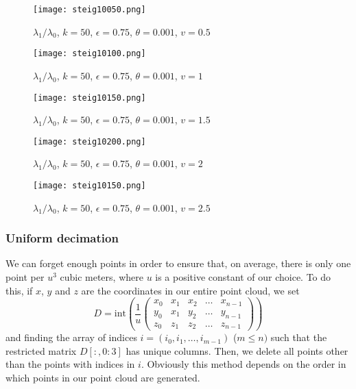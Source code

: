 \documentclass[a4paper,11pt,twoside]{article}
\theoremstyle{definition}
\theoremstyle{remark}
\begin{document}
\begin{figure}[!h]
  \caption{$\lambda_1/\lambda_0$, $k = 50$, $\epsilon = 0.75$, $\theta = 0.001$, $v = 0.5$}
  \centering
    \texttt{[image: steig10050.png]}
    \label{steig10050}
\end{figure}
\newpage
\begin{figure}[!h]
  \caption{$\lambda_1/\lambda_0$, $k = 50$, $\epsilon = 0.75$, $\theta = 0.001$, $v = 1$}
  \centering
    \texttt{[image: steig10100.png]}
    \label{steig10100}
\end{figure}

\begin{figure}[!h]
  \caption{$\lambda_1/\lambda_0$, $k = 50$, $\epsilon = 0.75$, $\theta = 0.001$, $v = 1.5$}
  \centering
    \texttt{[image: steig10150.png]}
    \label{steig10150}
\end{figure}
\newpage\begin{figure}[!h]
  \caption{$\lambda_1/\lambda_0$, $k = 50$, $\epsilon = 0.75$, $\theta = 0.001$, $v = 2$}
  \centering
    \texttt{[image: steig10200.png]}
    \label{steig10200}
\end{figure}

\begin{figure}[!h]
  \caption{$\lambda_1/\lambda_0$, $k = 50$, $\epsilon = 0.75$, $\theta = 0.001$, $v = 2.5$}
  \centering
    \texttt{[image: steig10150.png]}
    \label{steig10250}
\end{figure}
\newpage
\subsubsection{Uniform decimation}
We can forget enough points in order to ensure that, on average, there is only one point per $u^3$ cubic meters, where $u$ is a positive constant of our choice. To do this, if $x$, $y$ and $z$ are the coordinates in our entire point cloud, we set 
\begin{displaymath}
D=\mathrm{int}\left(\frac{1}{u}\begin{pmatrix}
x_0&x_1&x_2&\dots&x_{n-1}\\
y_0&x_1&y_2&\dots&y_{n-1}\\
z_0&z_1&z_2&\dots&z_{n-1}
\end{pmatrix}\right)
\end{displaymath}
and finding the array of indices $i=(i_0,i_1,\dots,i_{m-1})$ ($m\leqslant n)$ such that the restricted matrix $D[:,0:3]$ has unique columns. Then, we delete all points other than the points with indices in $i$. Obviously this method depends on the order in which points in our point cloud are generated. 
\end{document}
